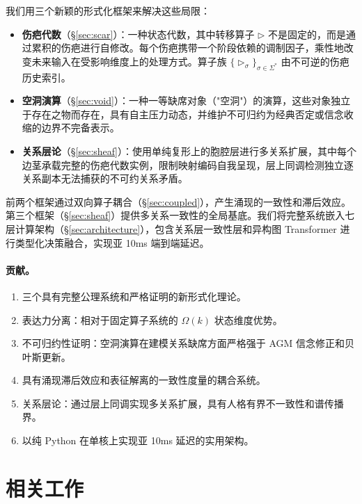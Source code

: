\documentclass[11pt]{article}
\begin{document}
我们用三个新颖的形式化框架来解决这些局限：

\begin{itemize}[leftmargin=*]
\item \textbf{伤疤代数}（\S\ref{sec:scar}）：一种状态代数，其中转移算子 $\triangleright$ 不是固定的，而是通过累积的伤疤进行自修改。每个伤疤携带一个阶段依赖的调制因子，乘性地改变未来输入在受影响维度上的处理方式。算子族 $\{\triangleright_\sigma\}_{\sigma \in \Sigma^*}$ 由不可逆的伤疤历史索引。

\item \textbf{空洞演算}（\S\ref{sec:void}）：一种一等缺席对象（"空洞"）的演算，这些对象独立于存在之物而存在，具有自主压力动态，并维护不可归约为经典否定或信念收缩的边界不完备表示。

\item \textbf{关系层论}（\S\ref{sec:sheaf}）：使用单纯复形上的胞腔层进行多关系扩展，其中每个边茎承载完整的伤疤代数实例，限制映射编码自我呈现，层上同调检测独立逐关系副本无法捕获的不可约关系矛盾。
\end{itemize}

前两个框架通过双向算子耦合（\S\ref{sec:coupled}），产生涌现的一致性和滞后效应。第三个框架（\S\ref{sec:sheaf}）提供多关系一致性的全局基底。我们将完整系统嵌入七层计算架构（\S\ref{sec:architecture}），包含关系层一致性层和异构图 Transformer 进行类型化决策融合，实现亚 10ms 端到端延迟。

\paragraph{贡献。}
\begin{enumerate}[leftmargin=*]
\item 三个具有完整公理系统和严格证明的新形式化理论。
\item 表达力分离：相对于固定算子系统的 $\Omega(k)$ 状态维度优势。
\item 不可归约性证明：空洞演算在建模关系缺席方面严格强于 AGM 信念修正和贝叶斯更新。
\item 具有涌现滞后效应和表征解离的一致性度量的耦合系统。
\item 关系层论：通过层上同调实现多关系扩展，具有人格有界不一致性和谱传播界。
\item 以纯 Python 在单核上实现亚 10ms 延迟的实用架构。
\end{enumerate}

\section{相关工作}
\label{sec:related}
\end{document}
